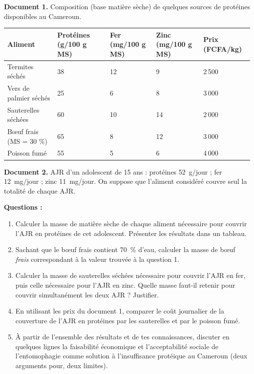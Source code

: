 \documentclass[11pt]{article}
\begin{document}
\begin{exercice}
\textbf{Document 1.} Composition (base matière sèche) de quelques sources de protéines disponibles au Cameroun.
\begin{center}
\begin{tabularx}{\linewidth}{|l|X|X|X|X|}\hline
\rowcolor{popblueL} \textbf{Aliment} & \textbf{Protéines (g/100 g MS)} & \textbf{Fer (mg/100 g MS)} & \textbf{Zinc (mg/100 g MS)} & \textbf{Prix (FCFA/kg)} \\ \hline
Termites séchés & 38 & 12 & 9 & 2\,500 \\ \hline
Vers de palmier séchés & 25 & 6 & 8 & 3\,000 \\ \hline
Sauterelles séchées & 60 & 10 & 14 & 2\,000 \\ \hline
Bœuf frais (MS = 30 \%) & 65 & 8 & 12 & 3\,000 \\ \hline
Poisson fumé & 55 & 5 & 6 & 4\,000 \\ \hline
\end{tabularx}
\end{center}
\textbf{Document 2.} AJR d'un adolescent de 15 ans : protéines \SI{52}{g/jour} ; fer \SI{12}{mg/jour} ; zinc \SI{11}{mg/jour}. On suppose que l'aliment considéré couvre seul la totalité de chaque AJR.

\textbf{Questions :}
\begin{enumerate}
\item Calculer la masse de matière sèche de chaque aliment nécessaire pour couvrir l'AJR en protéines de cet adolescent. Présenter les résultats dans un tableau.
\item Sachant que le bœuf frais contient \SI{70}{\percent} d'eau, calculer la masse de bœuf \emph{frais} correspondant à la valeur trouvée à la question 1.
\item Calculer la masse de sauterelles séchées nécessaire pour couvrir l'AJR en fer, puis celle nécessaire pour l'AJR en zinc. Quelle masse faut-il retenir pour couvrir simultanément les deux AJR ? Justifier.
\item En utilisant les prix du document 1, comparer le coût journalier de la couverture de l'AJR en protéines par les sauterelles et par le poisson fumé.
\item À partir de l'ensemble des résultats et de tes connaissances, discuter en quelques lignes la faisabilité économique et l'acceptabilité sociale de l'entomophagie comme solution à l'insuffisance protéique au Cameroun (deux arguments pour, deux limites).
\end{enumerate}
\end{exercice}
\end{document}
